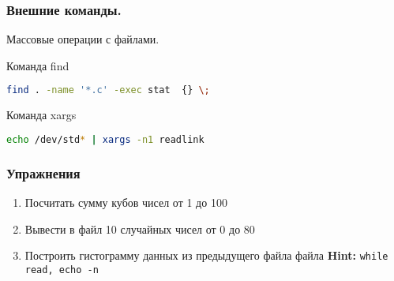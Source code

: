 \begin{frame}[fragile]
\frametitle{Внешние команды.}
Массовые операции с файлами.
  \begin{block}{Команда find}
    \begin{lstlisting}[language=sh,frame=single]
find . -name '*.c' -exec stat  {} \;
    \end{lstlisting}
  \end{block}
  \begin{block}{Команда xargs}
    \begin{lstlisting}[language=sh,frame=single]
echo /dev/std* | xargs -n1 readlink
    \end{lstlisting}
  \end{block}
\end{frame}

\begin{frame}[fragile]
    \frametitle{Упражнения}
    \begin{enumerate}
        \item Посчитать сумму кубов чисел от 1 до 100
        \item Вывести в файл 10 случайных чисел от 0 до 80
        \item Построить гистограмму данных из предыдущего файла файла {\bf Hint:} {\tt while read, echo -n }
    \end{enumerate}
\end{frame}
